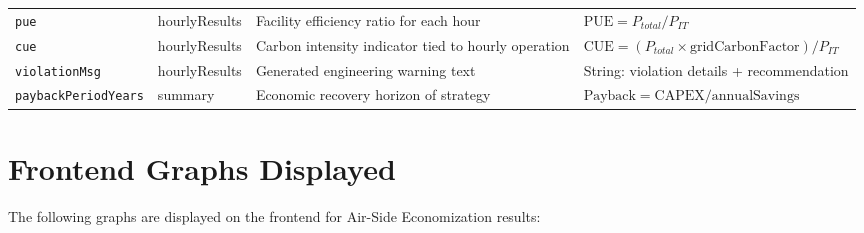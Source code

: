 \documentclass[12pt,a4paper]{report}
\begin{document}
\begin{table}[H]
\begin{tabular}{p{3cm}p{2.5cm}p{4.5cm}p{4.5cm}}
\texttt{pue} & hourlyResults & Facility efficiency ratio for each hour & $\text{PUE} = P_{total} / P_{IT}$ \\
\texttt{cue} & hourlyResults & Carbon intensity indicator tied to hourly operation & $\text{CUE} = (P_{total} \times \text{gridCarbonFactor}) / P_{IT}$ \\
\texttt{violationMsg} & hourlyResults & Generated engineering warning text & String: violation details + recommendation \\
\texttt{paybackPeriodYears} & summary & Economic recovery horizon of strategy & $\text{Payback} = \text{CAPEX} / \text{annualSavings}$ \\
\bottomrule
\end{tabular}
\end{table}

\section{Frontend Graphs Displayed}

The following graphs are displayed on the frontend for Air-Side Economization results:
\end{document}

